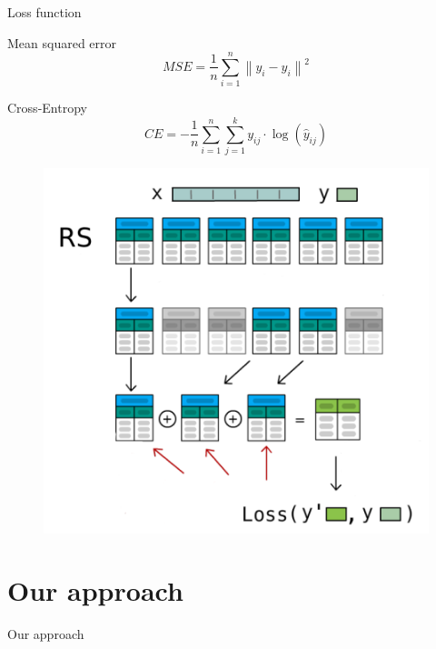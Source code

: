 \documentclass[aspectratio=169]{beamer}
\begin{document}
\begin{frame}{Loss function}
    \begin{block}{Mean squared error}
        \begin{equation}
MSE = \frac{1}{n} \sum_{i=1}^{n} \left\| y_i - \hat{y}_i \right\|^2
        \end{equation}
    \end{block}
    \begin{block}{{\rm Cross-Entropy}}
        \begin{equation}
        CE = - \frac{1}{n} \sum_{i=1}^{n} \sum_{j=1}^{k} y_{ij} \cdot \log(\hat{y}_{ij})
        \end{equation}
    
    \end{block}
        
\end{frame}
\begin{figure}
    \centering
    \includegraphics[width=0.55\linewidth]{../../fig/dst_ill_eng.png}
\end{figure}




\section{Our approach}
\begin{frame}
    \begin{center}
        \Huge Our approach
    \end{center}
\end{frame}
\end{document}
